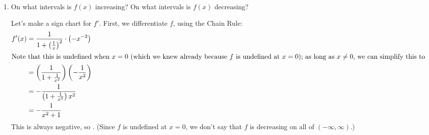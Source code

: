 \documentclass{article}
\begin{document}
\begin{enumerate}
\begin{enumerate}
\begin{solution}
      As $x \to 0^-$, $\frac{1}{x} \to -\infty$, so $\boxed{\lim_{x \to
          0^-} \arctan \left( \frac{1}{x} \right) = - \frac{\pi}{2}}$.
      (Alternatively, we can simply use the fact that $f$ is odd to say
      that $\displaystyle \lim_{x \to 0^-} f(x)$ must be the negative of
      $\displaystyle \lim_{x \to 0^+} f(x)$.)
    \end{solution}

  \item
    \begin{problem}[\nstretch{3}]
      On what intervals is $f(x)$ increasing?  On what intervals is $f(x)$
      decreasing?  
    \end{problem}

    \begin{solution}
      Let's make a sign chart for $f'$.  First, we differentiate $f$,
      using the Chain Rule:
      \begin{align*}
        f'(x) &= \frac{1}{1 + \left( \frac{1}{x} \right)^2} \cdot \left( -
          x^{-2} \right) \\
        \intertext{Note that this is undefined when $x = 0$ (which we knew
          already because $f$ is undefined at $x = 0$); as long as $x \neq
          0$, we can simplify this to}
        &= \left( \frac{1}{1 + \frac{1}{x^2}}  \right) \left( -
          \frac{1}{x^2} \right) \\
        &= - \frac{1}{\left( 1 + \frac{1}{x^2} \right) x^2} \\
        &= - \frac{1}{x^2 + 1}
      \end{align*}      
      This is always negative, so .  (Since $f$ is undefined at $x = 0$, we
      don't say that $f$ is decreasing on all of $(-\infty,
      \infty)$.)
      \begin{center}
      \end{center}
    \end{solution}


\end{enumerate}
\end{enumerate}
\end{document}

